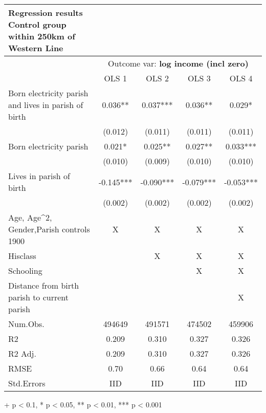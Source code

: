 \setlength{\LTpost}{0mm}
\begin{longtable}{lcccc}
\caption*{
{\large \textbf{Regression results}} \\ 
{\small Control group within 250km of Western Line}
} \\ 
\toprule
 & \multicolumn{4}{c}{Outcome var: \textbf{log income (incl zero)}} \\ 
\cmidrule(lr){2-5}
  & OLS 1 & OLS 2 & OLS 3 & OLS 4 \\ 
\midrule
Born electricity parish and lives in parish of birth & 0.036** & 0.037*** & 0.036** & 0.029* \\ 
 & (0.012) & (0.011) & (0.011) & (0.011) \\ 
Born electricity parish & 0.021* & 0.025** & 0.027** & 0.033*** \\ 
 & (0.010) & (0.009) & (0.010) & (0.010) \\ 
Lives in parish of birth & -0.145*** & -0.090*** & -0.079*** & -0.053*** \\ 
 & (0.002) & (0.002) & (0.002) & (0.002) \\ 
Age, Age\textasciicircum{}2, Gender,Parish controls 1900  & X & X & X & X \\ 
Hisclass &  & X & X & X \\ 
Schooling &  &  & X & X \\ 
Distance from birth parish to current parish &  &  &  & X \\ 
Num.Obs. & 494649 & 491571 & 474502 & 459906 \\ 
R2 & 0.209 & 0.310 & 0.327 & 0.326 \\ 
R2 Adj. & 0.209 & 0.310 & 0.327 & 0.326 \\ 
RMSE & 0.70 & 0.66 & 0.64 & 0.64 \\ 
Std.Errors & IID & IID & IID & IID \\ 
\bottomrule
\end{longtable}
\begin{minipage}{\linewidth}
+ p < 0.1, * p < 0.05, ** p < 0.01, *** p < 0.001\\
\end{minipage}

